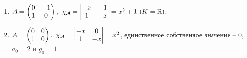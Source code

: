 \documentclass[main]{subfiles}
\begin{document}
\begin{example}
    \begin{enumerate}
        \item $A = \begin{pmatrix}
                      0 & -1 \\
                      1 & 0  \\
                  \end{pmatrix},\ \chi_{\mathcal{A}} = \begin{vmatrix}
                      -x & -1 \\
                      1  & -x \\
                  \end{vmatrix} = x^2+1 \ (K = \mathbb{R})$.
        \item $A = \begin{pmatrix}
                      0 & 0 \\
                      1 & 0 \\
                  \end{pmatrix},\ \chi_{\mathcal{A}} = \begin{vmatrix}
                      -x & 0  \\
                      1  & -x \\
                  \end{vmatrix} = x^2$, единственное собственное значение -- $0$, $a_0 = 2$ и $g_0 = 1$.
    \end{enumerate}
\end{example}
\end{document}
